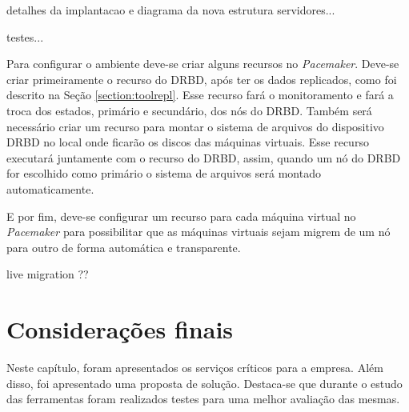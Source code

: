 detalhes da implantacao e diagrama da nova estrutura servidores...


testes...

Para configurar o ambiente deve-se criar alguns recursos no \textit{Pacemaker}.
Deve-se criar primeiramente o recurso do \ac{DRBD}, após ter os dados replicados, como foi descrito na Seção \ref{section:toolrepl}. Esse recurso 
fará o monitoramento e fará a troca dos estados, primário e secundário, dos nós do \ac{DRBD}.
Também será necessário criar um recurso para montar o sistema de arquivos do dispositivo \ac{DRBD} no local onde ficarão os discos das máquinas
virtuais. Esse recurso executará juntamente com o recurso do \ac{DRBD}, assim, quando um nó do \ac{DRBD} for escolhido como primário o sistema de
arquivos será montado automaticamente.

E por fim, deve-se configurar um recurso para cada máquina virtual no \textit{Pacemaker} para possibilitar que as
máquinas virtuais sejam migrem de um nó para outro de forma automática e transparente. 

live migration ??
% 

\section{Considerações finais}

Neste capítulo, foram apresentados os serviços críticos para a empresa. Além disso, foi apresentado uma proposta de solução. Destaca-se que 
durante o estudo das ferramentas foram realizados testes para uma melhor avaliação das mesmas.

